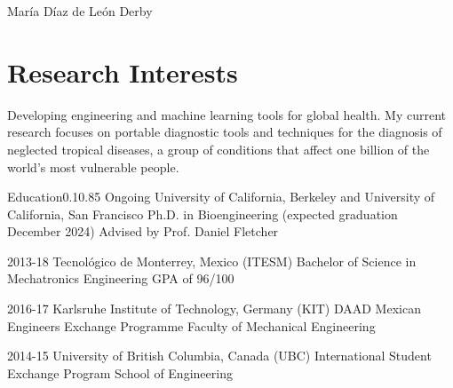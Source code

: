 \documentclass{federico_cv}
\begin{document}
\contact
{María Díaz de León Derby}
{} %
{} %



\section{Research Interests}
Developing engineering and machine learning tools for global health. My current research focuses on portable diagnostic tools and techniques for the diagnosis of neglected tropical diseases, a group of conditions that affect one billion of the world's most vulnerable people.


\begin{tblSection}{Education}{0.1}{0.85}
\degree
{Ongoing}
{University of California, Berkeley and University of California, San Francisco}
{Ph.D. in Bioengineering (expected graduation December 2024)}
{Advised by Prof. Daniel Fletcher}

\degree
{2013-18}
{Tecnológico de Monterrey, Mexico (ITESM)}
{Bachelor of Science in Mechatronics Engineering}
{GPA of 96/100}

\degree
{2016-17}
{Karlsruhe Institute of Technology, Germany (KIT)}
{DAAD Mexican Engineers Exchange Programme}
{Faculty of Mechanical Engineering}

\degree
{2014-15}
{University of British Columbia, Canada (UBC)}
{International Student Exchange Program}
{School of Engineering}

\end{tblSection}
\end{document}
